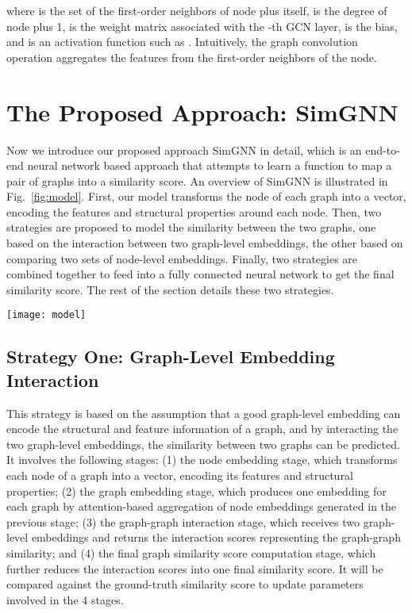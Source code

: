 \documentclass[sigconf]{acmart}
\begin{document}
 
where  is the set of the first-order neighbors of node  plus  itself,  is the degree of node  plus 1,  is the weight matrix associated with the -th GCN layer,  is the bias, and  is an activation function such as . Intuitively, the graph convolution operation aggregates the features from the first-order neighbors of the node.  \section{The Proposed Approach: SimGNN}
\label{sec-model}
Now we introduce our proposed approach SimGNN in detail, which is an end-to-end neural network based approach that attempts to learn a function to map a pair of graphs into a similarity score.
An overview of SimGNN is illustrated in Fig.~\ref{fig:model}. First, our model transforms the node of each graph into a vector, encoding the features and structural properties around each node. Then, two strategies are proposed to model the similarity between the two graphs, one based on the interaction between two graph-level embeddings, the other based on comparing two sets of node-level embeddings. Finally, two strategies are combined together to feed into a fully connected neural network to get the final similarity score. The rest of the section details these two strategies. \begin{figure*}
\centering
\texttt{[image: model]}
\vspace*{-3mm}
\caption{An overview illustration of SimGNN. The blue arrows denote the data flow for Strategy 1, which is based on graph-level embeddings. The red arrows denote the data flow for Strategy 2, which is based on pairwise node comparison.}
\label{fig:model}
\vspace*{-4mm}
\end{figure*}

\subsection{Strategy One: Graph-Level Embedding Interaction}

This strategy is based on the assumption that a good graph-level embedding can encode the structural and feature information of a graph, and by interacting the two graph-level embeddings, the similarity between two graphs can be predicted. It involves the following stages: (1) the node embedding stage, which transforms each node of a graph into a vector, encoding its features and structural properties; (2) the graph embedding stage, which produces one embedding for each graph by attention-based aggregation of node embeddings generated in the previous stage; (3) the graph-graph interaction stage, which receives two graph-level embeddings and returns the interaction scores representing the graph-graph similarity; and (4) the final graph similarity score computation stage, which further reduces the interaction scores into one final similarity score. It will be compared against the ground-truth similarity score to update parameters involved in the 4 stages.
\end{document}
